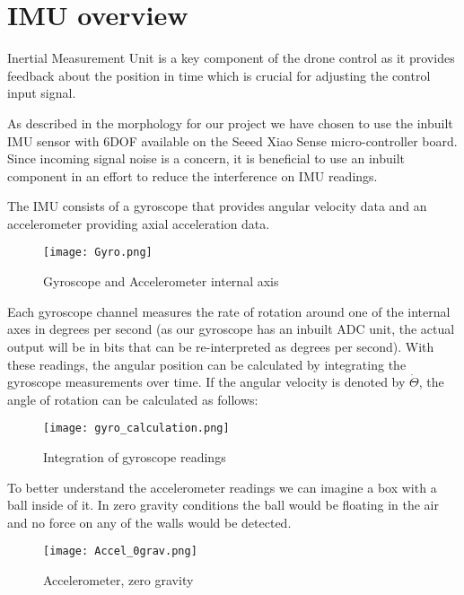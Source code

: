 \documentclass{article}
\begin{document}
\section{IMU overview}

Inertial Measurement Unit is a key component of the drone control as it provides feedback about the position in time which is crucial for adjusting the control input signal.

As described in the morphology for our project we have chosen to use the inbuilt IMU sensor with 6DOF available on the Seeed Xiao Sense micro-controller board. Since incoming signal noise is a concern, it is beneficial to use an inbuilt component in an effort to reduce the interference on IMU readings.

The IMU consists of a gyroscope that provides angular velocity
data and an accelerometer providing axial acceleration data.

\begin{figure}[H]
    \begin{center}
    \texttt{[image: Gyro.png]}
    \end{center}
    \caption{Gyroscope and Accelerometer internal axis}
    \label{fig:my_label}
\end{figure}


Each gyroscope channel measures the rate of rotation around one of the internal axes in degrees per second (as our gyroscope has an inbuilt ADC unit, the actual output will be in bits that can be re-interpreted as degrees per second). With these readings, the angular position can be calculated by integrating the gyroscope measurements over time. If the angular velocity is denoted by $\dot{\Theta}$, the angle of rotation can be calculated as follows:

\begin{figure}[H]
    \begin{center}
    \texttt{[image: gyro\_calculation.png]}
    \end{center}
    \caption{Integration of gyroscope readings}
    \label{fig:my_label}
\end{figure}


To better understand the accelerometer readings we can imagine a box with a ball inside of it. In zero gravity conditions the ball would be floating in the air and no force on any of the walls would be detected.


\begin{figure}[H]
    \begin{center}
    \texttt{[image: Accel\_0grav.png]}
    \end{center}
    \caption{Accelerometer, zero gravity}
    \label{fig:my_label}
\end{figure}
\end{document}
